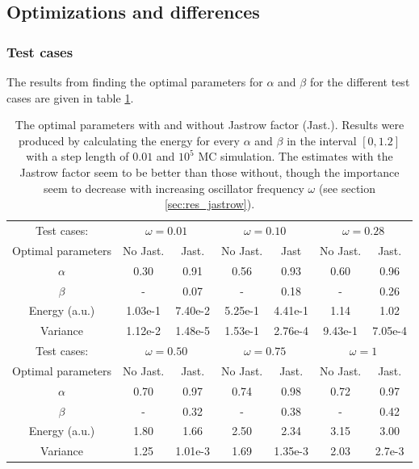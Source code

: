 \subsection{Optimizations and differences} \label{sec:res_opt_and_diff}

\subsubsection{Test cases} \label{sec:res_test_cases}

The results from finding the optimal parameters for $\alpha$ and $\beta$ for the different test cases are given in table \ref{tab:test_cases}.

\begin{table}[h!]
	\centering 
	\begin{tabular}{c  c c  c  c  c  c }
	\toprule
	 Test cases: 			& \multicolumn{2}{c}{$\omega=0.01$} & \multicolumn{2}{c}{$\omega=0.10$} & \multicolumn{2}{c}{$\omega=0.28$} \\
	 Optimal parameters  & No Jast. & 	Jast. & 	No Jast. & 	Jast &		No Jast. & 	Jast. \\
	 \midrule
	 $\alpha$& 				0.30 & 		0.91 & 		0.56	&	0.93	&	0.60 & 		0.96 		\\
	 $\beta$ & 				- & 		0.07 & 		-		&	0.18	&	- & 		0.26 	\\
	 \midrule
	 Energy (a.u.) & 		1.03e-1 &	7.40e-2 &	5.25e-1	&	4.41e-1	&	1.14  &		1.02 \\
	 Variance & 			1.12e-2 &	1.48e-5	& 	1.53e-1	&	2.76e-4	&	9.43e-1 & 	7.05e-4 	\\
	\bottomrule
	\toprule
	 Test cases: 			& \multicolumn{2}{c}{$\omega=0.50$} & \multicolumn{2}{c}{$\omega=0.75$} & \multicolumn{2}{c}{$\omega=1$} \\
	 Optimal parameters  & No Jast. & 	Jast. & 	No Jast. & 	Jast. & 	No Jast. & Jast. \\
	 \midrule
	 $\alpha$& 				0.70 & 		0.97 & 		0.74 & 		0.98 	& 	0.72	& 	0.97 	\\
	 $\beta$ & 				- & 		0.32 & 		- & 		0.38 & 		-  		& 	0.42 	\\
	 \midrule
	 Energy (a.u.) & 		1.80 &		1.66 &		2.50  &		2.34 & 		3.15 & 		3.00	\\
	 Variance & 			1.25 &		1.01e-3	& 	1.69 & 		1.35e-3 & 	2.03 & 		2.7e-3 	\\
	 \bottomrule
	\end{tabular}
	\caption{The optimal parameters with and without Jastrow factor (Jast.).
			 Results were produced by calculating the energy for every $\alpha$ and $\beta$ in the interval $[0,1.2]$ with 	a step length of $0.01$ and $10^5$ MC simulation.
			 The estimates with the Jastrow factor seem to be better than those without, though the importance seem to decrease with increasing oscillator frequency $\omega$ (see section \ref{sec:res_jastrow}). }
	\label{tab:test_cases}
\end{table}

